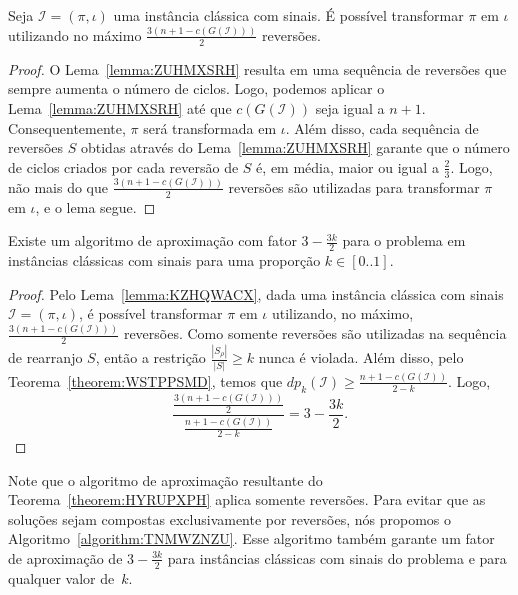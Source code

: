 

\begin{lemma}\label{lemma:KZHQWACX}
Seja $\mathcal{I} = (\pi,\iota)$ uma instância clássica com sinais. É possível transformar $\pi$ em $\iota$ utilizando no máximo $\frac{3(n + 1 -c(G(\mathcal{I})))}{2}$ reversões.
\end{lemma}
\begin{proof}
O Lema~\ref{lemma:ZUHMXSRH} resulta em uma sequência de reversões que sempre aumenta o número de ciclos. Logo, podemos aplicar o Lema~\ref{lemma:ZUHMXSRH} até que $c(G(\mathcal{I}))$ seja igual a ${n+1}$. Consequentemente, $\pi$ será transformada em $\iota$. Além disso, cada sequência de reversões $S$ obtidas através do Lema~\ref{lemma:ZUHMXSRH} garante que o número de ciclos criados por cada reversão de $S$ é, em média, maior ou igual a $\frac{2}{3}$. Logo, não mais do que $\frac{3(n + 1 -c(G(\mathcal{I})))}{2}$ reversões são utilizadas para transformar $\pi$ em $\iota$, e o lema segue.
\end{proof}

\begin{theorem}\label{theorem:HYRUPXPH}
Existe um algoritmo de aproximação com fator $3-\frac{3k}{2}$ para o problema \SbPRT{} em instâncias clássicas com sinais para uma proporção $k \in [0..1]$.
\end{theorem}
\begin{proof}
Pelo Lema~\ref{lemma:KZHQWACX}, dada uma instância clássica com sinais $\mathcal{I} = (\pi,\iota)$, é possível transformar $\pi$ em $\iota$ utilizando, no máximo, $\frac{3(n + 1 -c(G(\mathcal{I})))}{2}$ reversões. Como somente reversões são utilizadas na sequência de rearranjo $S$, então a restrição $\frac{|S_{\rho}|}{|S|} \ge k$ nunca é violada. Além disso, pelo Teorema~\ref{theorem:WSTPPSMD}, temos que $dp_{k}(\mathcal{I}) \ge \frac{n + 1 - c(G(\mathcal{I}))}{2-k}$. Logo,
$$\frac{\frac{3(n + 1 - c(G(\mathcal{I})))}{2}}{\frac{n + 1 - c(G(\mathcal{I}))}{2-k}} = 3-\frac{3k}{2}.$$
\end{proof}


Note que o algoritmo de aproximação resultante do Teorema~\ref{theorem:HYRUPXPH} aplica somente reversões. Para evitar que as soluções sejam compostas exclusivamente por reversões, nós propomos o Algoritmo~\ref{algorithm:TNMWZNZU}. Esse algoritmo também garante um fator de aproximação de $3-\frac{3k}{2}$ para instâncias clássicas com sinais do problema \SbPRT{} e para qualquer valor de~$k$.



